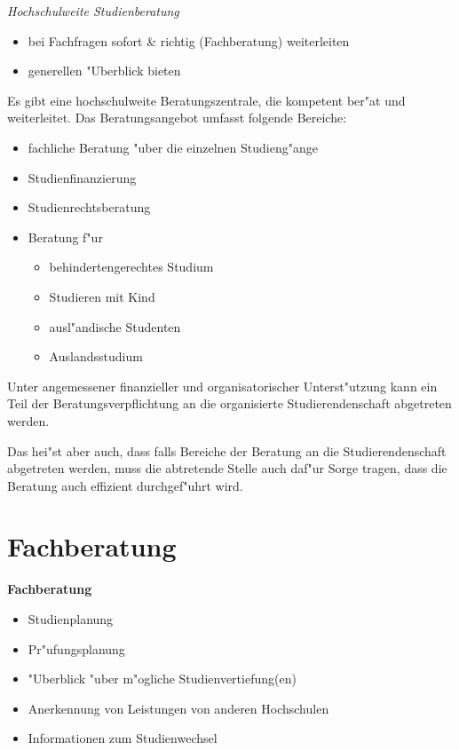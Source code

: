 \begin{kcmt}\begin{komacmt}
\emph{Hochschulweite Studienberatung}
\begin{itemize}
	\item bei Fachfragen sofort \& richtig (Fachberatung) weiterleiten
	\item generellen "Uberblick bieten
\end{itemize}
\end{komacmt}\end{kcmt}

Es gibt eine hochschulweite Beratungszentrale, die kompetent ber"at und weiterleitet.
Das Beratungsangebot umfasst folgende Bereiche:
\begin{itemize}
	\item fachliche Beratung "uber die einzelnen Studieng"ange
	\item Studienfinanzierung
	\item Studienrechtsberatung
	\item Beratung f"ur
		\begin{itemize}
			\item behindertengerechtes Studium
			\item Studieren mit Kind
			\item ausl"andische Studenten
			\item Auslandsstudium
		\end{itemize}
\end{itemize}

Unter angemessener finanzieller und organisatorischer Unterst"utzung kann ein 
Teil der Beratungsverpflichtung an die organisierte Studierendenschaft abgetreten werden.

\begin{kcmt}\begin{komacmt}
	Das hei"st aber auch, dass falls Bereiche der Beratung an die
	Studierendenschaft abgetreten werden, muss die abtretende Stelle
	auch daf"ur Sorge tragen, dass die Beratung auch effizient
	durchgef"uhrt wird.
\end{komacmt}\end{kcmt}

\section{Fachberatung}

\begin{kcmt}\begin{komacmt}
\textbf{Fachberatung}
\begin{itemize}
	\item Studienplanung
	\item Pr"ufungsplanung
	\item "Uberblick "uber m"ogliche Studienvertiefung(en)
	\item Anerkennung von Leistungen von anderen Hochschulen
	\item Informationen zum Studienwechsel
\end{itemize}
\end{komacmt}\end{kcmt}

